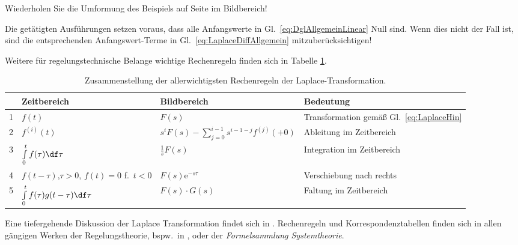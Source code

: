 \begin{RstAufgabeBox}
  \begin{small}
    Wiederholen Sie die Umformung des Beispiels auf Seite \pageref{eq:LaplaceeBsp1} im Bildbereich!
  \end{small}
\end{RstAufgabeBox}

\begin{RstWichtigBox}
  Die getätigten Ausführungen setzen voraus, dass alle Anfangswerte in Gl.~\eqref{eq:DglAllgemeinLinear} Null sind. Wenn dies nicht der Fall ist, sind die entsprechenden Anfangswert-Terme in Gl.~\eqref{eq:LaplaceDiffAllgemein} mitzuberücksichtigen!
\end{RstWichtigBox}

Weitere für regelungstechnische Belange wichtige Rechenregeln finden sich in Tabelle \ref{tab:LapalceRegeln}.
\begin{table}[ht!]
  \centering
  \begin{tabular}{|l|p{3.5cm}|l|l|} \hline
  \rowcolor{lightgray}&\textbf{Zeitbereich} & \textbf{Bildbereich} &\textbf{Bedeutung}\\ \hline
  1 &$f(t)$    &$F(s)$   &Transformation gemäß Gl.~\eqref{eq:LaplaceHin}\\ \hline
  2 &$f^{(i)}(t)$ &$s^i F(s) - \sum\limits_{j=0}^{i-1}s^{i-1-j} f^{(j)}(+0)$ &Ableitung im Zeitbereich \\ \hline
  3 &$\int\limits_0^t f(\tau)\df\tau$ &$\frac{1}{s}F(s)$ &Integration im Zeitbereich\\\hline
  4 &$f(t-\tau)$,\newline \small $\tau > 0$, $f(t) = 0$ f.~$t < 0$ &$F(s) \mathrm{e}^{-s\tau}$ &Verschiebung nach rechts \\ \hline
  5 &$\int\limits_0^t f(\tau) g(t - \tau) \df\tau$ &$F(s) \cdot G(s)$ &Faltung im Zeitbereich\\\hline
  \end{tabular}
  \caption{Zusammenstellung der allerwichtigsten Rechenregeln der Laplace-Transformation.}
  \label{tab:LapalceRegeln}
\end{table}

Eine  tiefergehende Diskussion der Laplace Transformation findet sich in \cite{FoellingerLapl}. Rechenregeln und Korrespondenztabellen finden sich in allen gängigen Werken der Regelungstheorie, bspw.~in \cite{Foellinger}, \cite{Wendt} oder der \emph{Formelsammlung Systemtheorie}.


